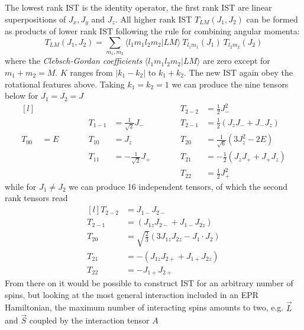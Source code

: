 \documentclass[11.5pt,a4paper]{article}
\begin{document}
The lowest rank IST is the identity operator, the first rank IST are linear superpositions of $J_x, J_y$ and $J_z$. All higher rank IST $T_{LM} (J_1,J_2)$ can be formed as products of lower rank IST following the rule for combining angular momenta:
\begin{equation}
 T_{LM}(J_1,J_2) = \sum_{m_1,m_2} \langle l_1 m_1 l_2 m_2 | L M \rangle \ T_{l_1 m_1} (J_1) \ T_{l_2 m_2} (J_2)
\end{equation}
where the \emph{Clebsch-Gordan coefficients} $\langle l_1 m_1 l_2 m_2 | L M \rangle$ are zero except for $m_1 + m_2 = M$. $K$ ranges from $|k_1-k_2|$ to $k_1+k_2$. The new IST again obey the rotational features above. Taking $k_1 = k_2 = 1$ we can produce the nine tensors below for $J_1 = J_2 = J$  
\begin{equation}
 \begin{matrix*}[l]
	&	& \quad \quad & &		& \quad \quad     & T_{2 -2}	& = \tfrac{1}{2} J_-^2 \\[1em]
	&	& & T_{1 -1}	& = \tfrac{1}{\sqrt{2}} J_-	& & T_{2 -1}	& = \tfrac{1}{2} ( J_z J_- + J_- J_z) \\[1em]
  T_{0 0}	& = E 	& & T_{1 0}	& = J_z 			& & T_{2 0} 	& = \tfrac{1}{\sqrt{6}} (3J_z^2-2E) \\[1em]
	&	& & T_{1 1}	& = -\tfrac{1}{\sqrt{2}} J_+	& & T_{2 1}	& = - \tfrac{1}{2} ( J_zJ_+ + J_+ J_z)\\[1em]
	&	& &		&				& & T_{2 2}	& = \tfrac{1}{2} J_+^2
 \end{matrix*}
\end{equation}
while for $J_1 \neq J_2$ we can produce 16 independent tensors, of which the second rank tensors read
\begin{equation}
 \begin{matrix*}[l]
	 T_{2 -2}	& = J_{1-} J_{2-} \\[1em]
	 T_{2 -1}	& = ( J_{1z} J_{2-} + J_{1-} J_{2z}) \\[1em]
	 T_{2 0} 	& = \sqrt{\tfrac{2}{3}} (3 J_{1z} J_{2z}-J_1\cdot J_2) \\[1em]
	 T_{2 1}	& =  - ( J_{1z} J_{2+} + J_{1+} J_{2z}) \\[1em]
	 T_{2 2}	& = - J_{1+} J_{2+}
 \end{matrix*}
\end{equation}
From there on it would be possible to construct IST for an arbitrary number of spins, but looking at the most general interaction included in an EPR Hamiltonian, the maximum number of interacting spins amounts to two, e.g. $\vec{L}$ and $\vec{S}$ coupled by the interaction tensor $A$ 
\end{document}
